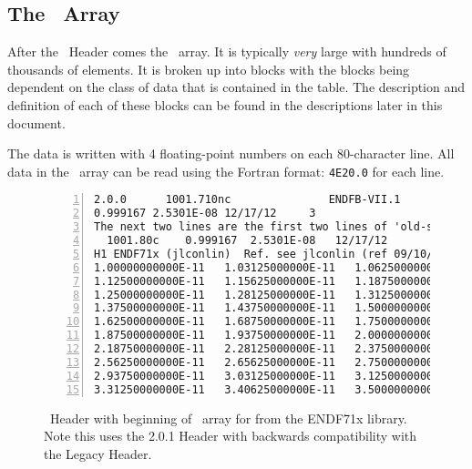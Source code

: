 \subsection{The \XSS\ Array}
After the \ACE\ Header comes the \XSS\ array. It is typically \emph{very} large with hundreds of thousands of elements. It is broken up into blocks with the blocks being dependent on the class of data that is contained in the table. The description and definition of each of these blocks can be found in the descriptions later in this document.

The data is written with \num{4} floating-point numbers on each 80-character line.  All data in the \XSS\ array can be read using the Fortran format: \texttt{4E20.0} for each line.

\begin{figure}[h!] \centering
\begin{Verbatim}[frame=single,fontsize=\footnotesize,numbers=left, numbersep=2pt]
2.0.0      1001.710nc               ENDFB-VII.1             
0.999167 2.5301E-08 12/17/12     3
The next two lines are the first two lines of 'old-style' ACE.
  1001.80c    0.999167  2.5301E-08   12/17/12
H1 ENDF71x (jlconlin)  Ref. see jlconlin (ref 09/10/2012  10:00:53)      mat 125
1.00000000000E-11   1.03125000000E-11   1.06250000000E-11   1.09375000000E-11
1.12500000000E-11   1.15625000000E-11   1.18750000000E-11   1.21875000000E-11
1.25000000000E-11   1.28125000000E-11   1.31250000000E-11   1.34375000000E-11
1.37500000000E-11   1.43750000000E-11   1.50000000000E-11   1.56250000000E-11
1.62500000000E-11   1.68750000000E-11   1.75000000000E-11   1.81250000000E-11
1.87500000000E-11   1.93750000000E-11   2.00000000000E-11   2.09375000000E-11
2.18750000000E-11   2.28125000000E-11   2.37500000000E-11   2.46875000000E-11
2.56250000000E-11   2.65625000000E-11   2.75000000000E-11   2.84375000000E-11
2.93750000000E-11   3.03125000000E-11   3.12500000000E-11   3.21875000000E-11
3.31250000000E-11   3.40625000000E-11   3.50000000000E-11   3.59375000000E-11
\end{Verbatim}
\caption{\ACE\ Header with beginning of \XSS\ array for  from the ENDF71x library. Note this uses the 2.0.1 Header with backwards compatibility with the Legacy Header.}
  \label{fig:XSSExample}
\end{figure}

